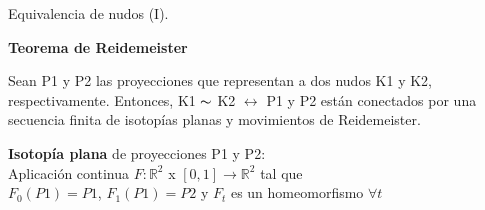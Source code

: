 \documentclass{beamer}
\begin{document}
\begin{frame}{Equivalencia de nudos (I).} 
    \begin{alertblock}{\begin{center}
    			\textbf{Teorema de Reidemeister}
    		\end{center}}
    	\begin{center}
    		Sean P1 y P2 las proyecciones que representan a dos nudos K1 y K2, respectivamente. Entonces, K1 $\thicksim$ K2 $\leftrightarrow$ P1 y P2 están conectados por una secuencia finita de isotopías planas y movimientos de Reidemeister.
    	\end{center}
    \end{alertblock}
    \vspace{1cm}
    \pause
	\textbf{Isotopía plana} de proyecciones P1 y P2:\\
	Aplicación continua $F: \mathds{R}^{2}$ x $[0,1] \rightarrow \mathds{R}^{2}$ tal que\\ $F_{0}(P1)=P1$, $F_{1}(P1) = P2$ y $F_{t}$ es un homeomorfismo $\forall t$
	
\end{frame}
\end{document}
